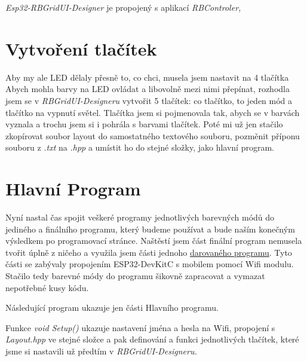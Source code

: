 {\em Esp32-RBGridUI-Designer} je propojený s aplikací {\em RBControler,} \cite{RBControler}

\section{Vytvoření tlačítek}
Aby my ale LED dělaly přesně to, co chci, musela jsem nastavit na  4 tlačítka
Abych mohla barvy na LED ovládat a libovolně mezi nimi přepínat, rozhodla jsem se v {\em RBGridUI-Designeru} vytvořit 5 tlačítek: co tlačítko, to jeden mód a tlačítko na vypnutí světel. Tlačítka jsem si pojmenovala tak, abych se v barvách vyznala a trochu jsem si i pohrála s barvami tlačítek. Poté mi už jen stačilo zkopírovat soubor layout do samostatného textového souboru, pozměnit příponu souboru z {\em .txt} na {\em .hpp} a umístit ho do stejné složky, jako hlavní program.

\section{Hlavní Program} 
Nyní nastal čas spojit veškeré programy jednotlivých barevných módů do jediného a finálního programu, který budeme používat a bude naším konečným výsledkem po programovací stránce. 
Naštěstí jsem část finální program nemusela tvořit úplně z ničeho a využila jsem části jednoho \href{https://github.com/Nemesis-Rain/Supplements-/tree/main/Originální%20program%20%2B%20layout}{darovaného programu}.
 Tyto části se zabývaly propojením ESP32-DevKitC s mobilem pomocí Wifi modulu. Stačilo tedy barevné módy do programu šikovně zapracovat a vymazat nepotřebné kusy kódu.


Následující program ukazuje jen části Hlavního programu. 

Funkce {\em void Setup()} ukazuje nastavení jména a hesla na Wifi, propojení s {\em Layout.hpp} ve stejné složce a pak definování a funkci jednotlivých tlačítek, které jsme si nastavili už předtím v {\em RBGridUI-Designeru.}

